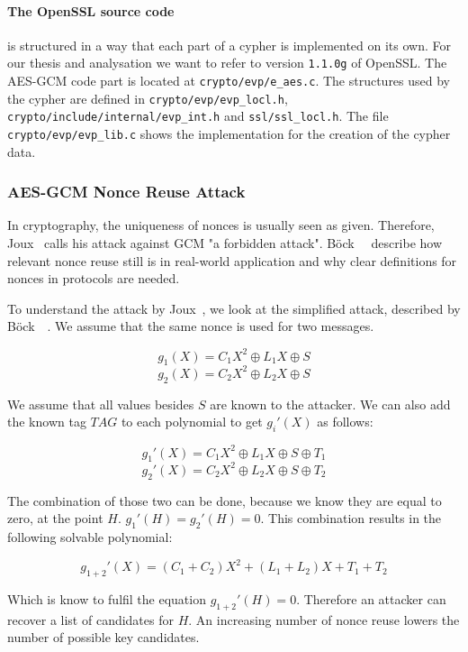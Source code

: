 \paragraph{The OpenSSL source code} is structured in a way that each part of a
cypher is implemented on its own. For our thesis and analysation we want to
refer to version \texttt{1.1.0g} of OpenSSL\cite{opensslsource}. The AES-GCM
code part is located at \texttt{crypto/evp/e\_aes.c}. The structures used by the
cypher are defined in \texttt{crypto/evp/evp\_locl.h},
\texttt{crypto/include/internal/evp\_int.h} and \texttt{ssl/ssl\_locl.h}. The
file \texttt{crypto/evp/evp\_lib.c} shows the implementation for the creation of
the cypher data.

\subsubsection{AES-GCM Nonce Reuse Attack}

In cryptography, the uniqueness of nonces is usually seen as given. Therefore,
Joux~\cite{NISTGCMcomment} calls his attack against GCM "a forbidden attack".
Böck~\etal~\cite{gcmnonceattack} describe how relevant nonce reuse still is in
real-world application and why clear definitions for nonces in protocols
are needed.

To understand the attack by Joux~\cite{NISTGCMcomment}, we look at the
simplified attack, described by Böck~\etal~\cite{gcmnonceattack}. We assume
that the same nonce is used for two messages.

\[g_1(X) = C{_{1}X^2 \oplus L_1X \oplus S}\]
\[g_2(X) = C{_{2}X^2 \oplus L_2X \oplus S}\]

We assume that all values besides $S$ are known to the attacker. We can also
add the known tag $TAG$ to each polynomial to get $g_i'(X)$ as follows:

\[g_1'(X) = C{_{1}X^2 \oplus L_1X \oplus S \oplus T_1}\]
\[g_2'(X) = C{_{2}X^2 \oplus L_2X \oplus S \oplus T_2}\]

The combination of those two can be done, because we know they are equal to
zero, at the point $H$. $g_1'(H) = g_2'(H) = 0$. This combination results in
the following solvable polynomial:

\[g_{1+2}'(X) = (C_{1} + C_{2})X^2 + (L_1 + L_2)X + T_1 + T_2\]

Which is know to fulfil the equation $g_{1+2}'(H) = 0$. Therefore an attacker
can recover a list of candidates for $H$. An increasing number of nonce
reuse lowers the number of possible key candidates.

